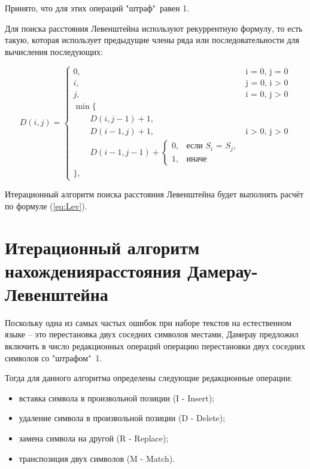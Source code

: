 Принято, что для этих операций "штраф"\ равен 1. \newline

Для поиска расстояния Левенштейна используют рекуррентную формулу, то есть такую, которая использует предыдущие члены ряда или последовательности для вычисления последующих:


\begin{equation}
	\label{eq:Lev}
	D(i, j) = \begin{cases}
		
		0, &\text{i = 0, j = 0}\\
		i, &\text{j = 0, i > 0}\\
		j, &\text{i = 0, j > 0}\\
		\min \lbrace \\
		\qquad D(i, j-1) + 1,\\
		\qquad D(i-1, j) + 1, &\text{i > 0, j > 0}\\
		\qquad D(i-1, j-1) + \begin{cases}
                        		0, &\text{если $S_{i}$ = $S_{j}$,}\\
                        		1, &\text{иначе}
                        	\end{cases}\\
		\rbrace,
	\end{cases}
\end{equation}

Итерационный алгоритм поиска расстояния Левенштейна будет выполнять расчёт по формуле (\ref{eq:Lev}).

\section{Итерационный алгоритм нахождения\newline расстояния Дамерау-Левенштейна}
Поскольку одна из самых частых ошибок при наборе текстов на естественном языке -- это перестановка двух соседних символов местами, Дамерау предложил включить в число редакционных операций операцию перестановки двух соседних символов со "штрафом"\ 1.

Тогда для данного алгоритма определены следующие редакционные операции:
\begin{itemize}
        \item вставка символа в произвольной позиции (I - Insert);
        \item удаление символа в произвольной позиции (D - Delete);
        \item замена символа на другой (R - Replace);
        \item транспозиция двух символов (M - Match).
\end{itemize} 


